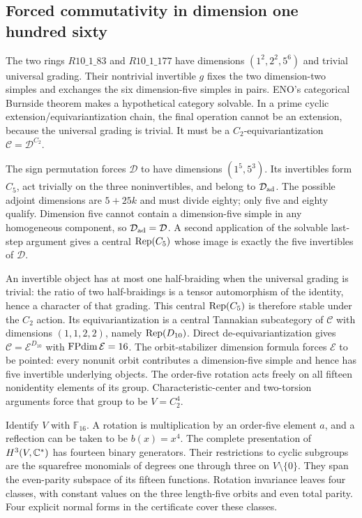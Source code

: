 \subsection{Forced commutativity in dimension one hundred sixty}
The two rings $R10\_1\_83$ and $R10\_1\_177$ have dimensions
$(1^2,2^2,5^6)$ and trivial universal grading. Their nontrivial invertible
$g$ fixes the two dimension-two simples and exchanges the six dimension-five
simples in pairs. ENO's categorical Burnside theorem makes a hypothetical
category solvable. In a prime cyclic extension/equivariantization chain,
the final operation cannot be an extension, because the universal grading
is trivial. It must be a $C_2$-equivariantization
$\mathcal C=\mathcal D^{C_2}$.

The sign permutation forces $\mathcal D$ to have dimensions $(1^5,5^3)$.
Its invertibles form $C_5$, act trivially on the three noninvertibles, and
belong to $\mathcal D_{\rm ad}$. The possible adjoint dimensions are
$5+25k$ and must divide eighty; only five and eighty qualify. Dimension
five cannot contain a dimension-five simple in any homogeneous component,
so $\mathcal D_{\rm ad}=\mathcal D$. A second application of the solvable
last-step argument gives a central $\operatorname{Rep}(C_5)$ whose image is exactly the
five invertibles of $\mathcal D$.

An invertible object has at most one half-braiding when the universal grading
is trivial: the ratio of two half-braidings is a tensor automorphism of
the identity, hence a character of that grading. This central $\operatorname{Rep}(C_5)$
is therefore stable under the $C_2$ action. Its equivariantization is a
central Tannakian subcategory of $\mathcal C$ with dimensions $(1,1,2,2)$,
namely $\operatorname{Rep}(D_{10})$. Direct de-equivariantization gives
$\mathcal C=\mathcal E^{D_{10}}$ with $\operatorname{FPdim}\mathcal E=16$.
The orbit-stabilizer dimension formula forces $\mathcal E$ to be pointed:
every nonunit orbit contributes a dimension-five simple and hence has five
invertible underlying objects. The order-five rotation acts freely on all
fifteen nonidentity elements of its group. Characteristic-center and
two-torsion arguments force that group to be $V=C_2^4$.

Identify $V$ with $\mathbb F_{16}$. A rotation is multiplication by an
order-five element $a$, and a reflection can be taken to be $b(x)=x^4$.
The complete presentation of $H^3(V,\mathbb C^*)$ has fourteen binary generators.
Their restrictions to cyclic subgroups are the squarefree monomials of
degrees one through three on $V\setminus\{0\}$. They span the even-parity
subspace of its fifteen functions. Rotation invariance leaves four classes,
with constant values on the three length-five orbits and even total parity.
Four explicit normal forms in the certificate cover these classes.

